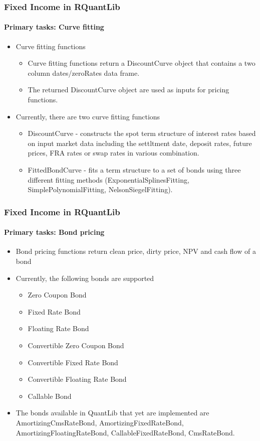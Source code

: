 \documentclass[compress]{beamer}
\begin{document}
\begin{frame}
	\frametitle{Fixed Income in RQuantLib}
	\framesubtitle{Primary tasks: Curve fitting}
	\begin{itemize}
		\item Curve fitting functions
			\begin{itemize}
				\item Curve fitting functions return a DiscountCurve object that contains a two column dates/zeroRates data frame.
				\item The returned DiscountCurve object are used as inputs for pricing functions. 
			\end{itemize}
		\item Currently, there are two curve fitting functions
			\begin{itemize}
				\item DiscountCurve - constructs the spot term structure of interest rates based on input market data including the settltment date, deposit rates, future prices, FRA rates or swap rates in various combination.
				\item FittedBondCurve - fits a term structure to a set of bonds using three different fitting methods (ExponentialSplinesFitting, SimplePolynomialFitting, NelsonSiegelFitting).
			\end{itemize}
	\end{itemize}
\end{frame}

\begin{frame}
	\frametitle{Fixed Income in RQuantLib}
	\framesubtitle{Primary tasks: Bond pricing}
	\begin{itemize}
		\item Bond pricing functions return clean price, dirty price, NPV and cash flow of a bond
		\item Currently, the following bonds are supported
			\begin{itemize}
				\item Zero Coupon Bond
				\item Fixed Rate Bond
				\item Floating Rate Bond
				\item Convertible Zero Coupon Bond
				\item Convertible Fixed Rate Bond												
				\item Convertible Floating Rate Bond
				\item Callable Bond
			\end{itemize}
		\item The bonds available in QuantLib that yet are implemented are AmortizingCmsRateBond, AmortizingFixedRateBond, AmortizingFloatingRateBond, CallableFixedRateBond, CmsRateBond.
	\end{itemize}
\end{frame}
\end{document}
